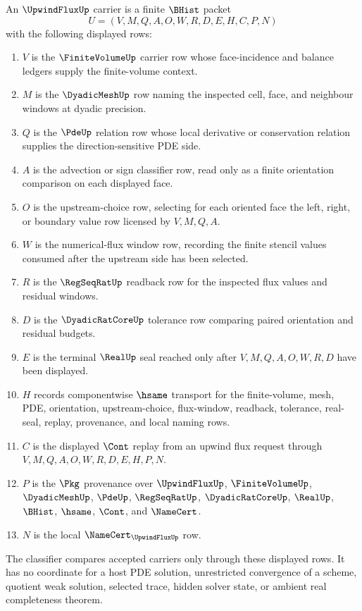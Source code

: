 \begin{definition}
\label{def:upwind-flux-carrier}
An $\UpwindFluxUp$ carrier is a finite $\BHist$ packet
$$
U=(V,M,Q,A,O,W,R,D,E,H,C,P,N)
$$
with the following displayed rows:
\begin{enumerate}
\item $V$ is the $\FiniteVolumeUp$ carrier row whose face-incidence and balance ledgers supply the finite-volume context.
\item $M$ is the $\DyadicMeshUp$ row naming the inspected cell, face, and neighbour windows at dyadic precision.
\item $Q$ is the $\PdeUp$ relation row whose local derivative or conservation relation supplies the direction-sensitive PDE side.
\item $A$ is the advection or sign classifier row, read only as a finite orientation comparison on each displayed face.
\item $O$ is the upstream-choice row, selecting for each oriented face the left, right, or boundary value row licensed by $V,M,Q,A$.
\item $W$ is the numerical-flux window row, recording the finite stencil values consumed after the upstream side has been selected.
\item $R$ is the $\RegSeqRatUp$ readback row for the inspected flux values and residual windows.
\item $D$ is the $\DyadicRatCoreUp$ tolerance row comparing paired orientation and residual budgets.
\item $E$ is the terminal $\RealUp$ seal reached only after $V,M,Q,A,O,W,R,D$ have been displayed.
\item $H$ records componentwise $\hsame$ transport for the finite-volume, mesh, PDE, orientation, upstream-choice, flux-window, readback, tolerance, real-seal, replay, provenance, and local naming rows.
\item $C$ is the displayed $\Cont$ replay from an upwind flux request through $V,M,Q,A,O,W,R,D,E,H,P,N$.
\item $P$ is the $\Pkg$ provenance over $\UpwindFluxUp$, $\FiniteVolumeUp$, $\DyadicMeshUp$, $\PdeUp$, $\RegSeqRatUp$, $\DyadicRatCoreUp$, $\RealUp$, $\BHist$, $\hsame$, $\Cont$, and $\NameCert$.
\item $N$ is the local $\NameCert_{\UpwindFluxUp}$ row.
\end{enumerate}
The classifier compares accepted carriers only through these displayed rows. It has no coordinate for a host PDE solution, unrestricted convergence of a scheme, quotient weak solution, selected trace, hidden solver state, or ambient real completeness theorem.
\end{definition}

